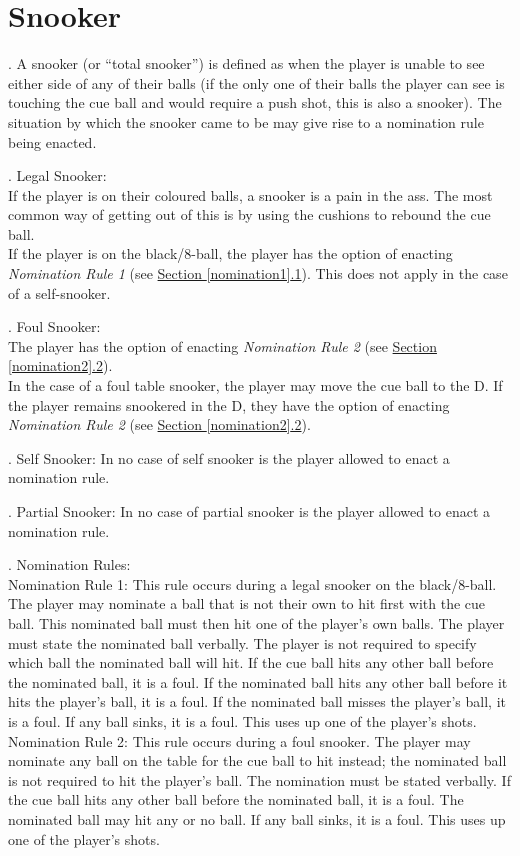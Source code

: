 \documentclass[a4paper, twocolumn]{article}
\newcommand{\fixedlabel}[1]{\textbf{\makebox[3.5em][l]{#1}}}
\newcommand{\itemspace}{\vspace{1.2mm}\\}
\begin{document}
\section{Snooker} \label{snooker}
\ex. A snooker (or “total snooker”) is defined as when the player is unable to see either side of any of their balls (if the only one of their balls the player can see is touching the cue ball and would require a push shot, this is also a snooker). The situation by which the snooker came to be may give rise to a nomination rule being enacted.\par
\ex. Legal Snooker:\itemspace
\fixedlabel{6.2.1}If the player is on their coloured balls, a snooker is a pain in the ass. The most common way of getting out of this is by using the cushions to rebound the cue ball.\itemspace
\fixedlabel{6.2.2}If the player is on the black/8-ball, the player has the option of enacting \emph{Nomination Rule 1} (see \hyperref[nomination1]{Section \ref*{nomination1}.1}). This does not apply in the case of a self-snooker.
\par
\ex. Foul Snooker:\itemspace
\fixedlabel{6.3.1}The player has the option of enacting \emph{Nomination Rule 2} (see \hyperref[nomination2]{Section \ref*{nomination2}.2}).\itemspace
\fixedlabel{6.3.2}In the case of a foul table snooker, the player may move the cue ball to the D. If the player remains snookered in the D, they have the option of enacting \emph{Nomination Rule 2} (see \hyperref[nomination2]{Section \ref*{nomination2}.2}).
\par
\ex. Self Snooker: In no case of self snooker is the player allowed to enact a nomination rule.\par
\ex. Partial Snooker: In no case of partial snooker is the player allowed to enact a nomination rule.\par
\ex. Nomination Rules:\itemspace
\fixedlabel{6.6.1}\label{nomination1}Nomination Rule 1: This rule occurs during a legal snooker on the black/8-ball. The player may nominate a ball that is not their own to hit first with the cue ball. This nominated ball must then hit one of the player's own balls. The player must state the nominated ball verbally. The player is not required to specify which ball the nominated ball will hit. If the cue ball hits any other ball before the nominated ball, it is a foul. If the nominated ball hits any other ball before it hits the player's ball, it is a foul. If the nominated ball misses the player's ball, it is a foul. If any ball sinks, it is a foul. This uses up one of the player's shots.\itemspace
\fixedlabel{6.6.2}\label{nomination2}Nomination Rule 2: This rule occurs during a foul snooker. The player may nominate any ball on the table for the cue ball to hit instead; the nominated ball is not required to hit the player's ball. The nomination must be stated verbally. If the cue ball hits any other ball before the nominated ball, it is a foul. The nominated ball may hit any or no ball. If any ball sinks, it is a foul. This uses up one of the player's shots.
\par
\end{document}
